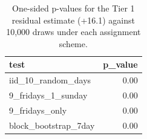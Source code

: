 \begin{table}
\caption{One-sided p-values for the Tier 1 residual estimate (+16.1) against 10,000 draws under each assignment scheme.}
\begin{tabular}{lr}
\toprule
test & p\_value \\
\midrule
iid\_10\_random\_days & 0.00 \\
9\_fridays\_1\_sunday & 0.00 \\
9\_fridays\_only & 0.00 \\
block\_bootstrap\_7day & 0.00 \\
\bottomrule
\end{tabular}
\end{table}
